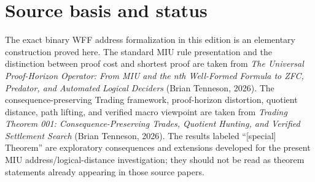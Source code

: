 \documentclass[11pt]{article}
\begin{document}
\section*{Source basis and status}
The exact binary WFF address formalization in this edition is an elementary construction proved here. The standard MIU rule presentation and the distinction between proof cost and shortest proof are taken from \emph{The Universal Proof-Horizon Operator: From MIU and the nth Well-Formed Formula to ZFC, Predator, and Automated Logical Deciders} (Brian Tenneson, 2026). The consequence-preserving Trading framework, proof-horizon distortion, quotient distance, path lifting, and verified macro viewpoint are taken from \emph{Trading Theorem 001: Consequence-Preserving Trades, Quotient Hunting, and Verified Settlement Search} (Brian Tenneson, 2026). The results labeled ``[special] Theorem'' are exploratory consequences and extensions developed for the present MIU address/logical-distance investigation; they should not be read as theorem statements already appearing in those source papers.
\end{document}
